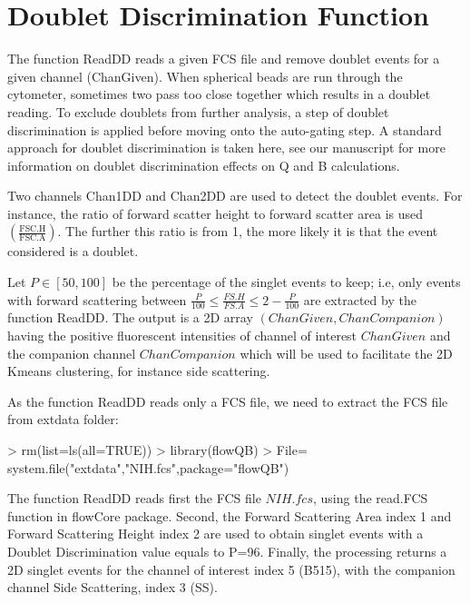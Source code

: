 \documentclass{article}
\begin{document}
\section{Doublet Discrimination Function}\label{rd}

The function ReadDD reads a given FCS file and remove doublet events for a given channel (ChanGiven). When spherical beads are run through the cytometer, sometimes two pass too close together which results in a doublet reading. 
To exclude doublets from further analysis, a step of doublet discrimination is applied before moving onto the auto-gating step. A standard approach for doublet discrimination is taken here, see our manuscript \cite{f} for more information on doublet discrimination effects on Q and B calculations.

Two channels Chan1DD and Chan2DD are used to detect the doublet events. For instance, the ratio of forward scatter height to forward scatter area is used $\left( \frac{\text{FSC.H}}{\text{FSC.A}} \right)$. The further this ratio is from 1, the more likely it is that the event considered is a doublet. 

Let $P \in [50,100]$ be the percentage of the singlet events to keep; i.e,  only events with forward scattering between $\frac{P}{100} \leq  \frac{FS .H}{FS.A} \leq 2-\frac{P}{100}$ are extracted by the function ReadDD. The output is a 2D array $(ChanGiven,ChanCompanion)$ having the positive fluorescent intensities of channel of interest $ChanGiven$ and the companion channel $ChanCompanion$ which will be used to facilitate the 2D Kmeans clustering, for instance side scattering. 

As the function ReadDD reads only a FCS file, we need to extract the FCS file from extdata folder:

\begin{Schunk}
\begin{Sinput}
> rm(list=ls(all=TRUE))
> library(flowQB)
> File= system.file("extdata","NIH.fcs",package="flowQB")
\end{Sinput}
\end{Schunk}

The function ReadDD reads first the FCS file $NIH.fcs$, using the read.FCS function in flowCore package.
Second, the Forward Scattering Area index 1 and Forward Scattering  Height index 2 are used to obtain singlet events with a Doublet Discrimination value equals to P=96. Finally, the processing returns a 2D singlet events for the channel  of interest index 5 (B515), with the companion channel Side Scattering, index 3 (SS).
\end{document}
